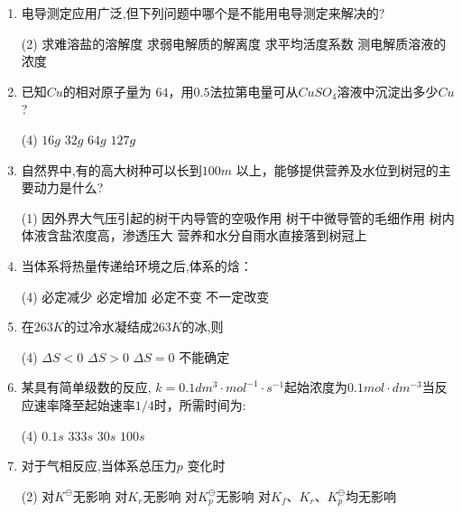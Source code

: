 \begin{enumerate}[label=\arabic*., itemsep=1.5ex]
    \begin{tasks}(4)
        \task $6400J$
        \task $12000J$
        \task $25100J$
        \task $36740J$
    \end{tasks}
    \item 电导测定应用广泛,但下列问题中哪个是不能用电导测定来解决的?
    \begin{tasks}(2)
        \task 求难溶盐的溶解度
        \task 求弱电解质的解离度
        \task 求平均活度系数
        \task 测电解质溶液的浓度
    \end{tasks}
    \item 已知$Cu$的相对原子量为 $64$，用$0.5$法拉第电量可从$CuSO_4$溶液中沉淀出多少$Cu$?
    \begin{tasks}(4)
        \task $16g$
        \task $32g$
        \task $64g$
        \task $127g$
    \end{tasks}
    \item 自然界中,有的高大树种可以长到$100m$ 以上，能够提供营养及水位到树冠的主要动力是什么?
    \begin{tasks}(1)
        \task 因外界大气压引起的树干内导管的空吸作用
        \task 树干中微导管的毛细作用
        \task 树内体液含盐浓度高，渗透压大
        \task 营养和水分自雨水直接落到树冠上
    \end{tasks}
    \item 当体系将热量传递给环境之后,体系的焓：
    \begin{tasks}(4)
        \task 必定减少
        \task 必定增加
        \task 必定不变
        \task 不一定改变
    \end{tasks}
    \item 在$263K$的过冷水凝结成$263K$的冰,则
    \begin{tasks}(4)
        \task $\Delta S<0$
        \task $\Delta S>0$
        \task $\Delta S=0$
        \task 不能确定
    \end{tasks}
    \item 某具有简单级数的反应, $k=0.1dm^3\cdot mol^{-1}\cdot s^{-1}$起始浓度为$0.1mol\cdot dm^{-3}$当反应速率降至起始速率$1/4$时，所需时间为:
    \begin{tasks}(4)
        \task $0.1s$
        \task $333s$
        \task $30s$
        \task $100s$
    \end{tasks}
    \item 对于气相反应,当体系总压力$p$ 变化时
    \begin{tasks}(2)
        \task 对$K^\ominus$无影响
        \task 对$K_r$无影响
        \task 对$K_p^\ominus$无影响
        \task 对$K_f$、$K_r$、$K_p^\ominus$均无影响

\end{tasks}
\end{enumerate}
